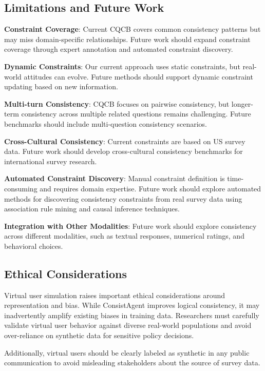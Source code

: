 \documentclass[sigconf, anonymous]{acmart}
\begin{document}
\subsection{Limitations and Future Work}

\textbf{Constraint Coverage}: Current CQCB covers common consistency patterns but may miss domain-specific relationships. Future work should expand constraint coverage through expert annotation and automated constraint discovery.

\textbf{Dynamic Constraints}: Our current approach uses static constraints, but real-world attitudes can evolve. Future methods should support dynamic constraint updating based on new information.

\textbf{Multi-turn Consistency}: CQCB focuses on pairwise consistency, but longer-term consistency across multiple related questions remains challenging. Future benchmarks should include multi-question consistency scenarios.

\textbf{Cross-Cultural Consistency}: Current constraints are based on US survey data. Future work should develop cross-cultural consistency benchmarks for international survey research.

\textbf{Automated Constraint Discovery}: Manual constraint definition is time-consuming and requires domain expertise. Future work should explore automated methods for discovering consistency constraints from real survey data using association rule mining and causal inference techniques.

\textbf{Integration with Other Modalities}: Future work should explore consistency across different modalities, such as textual responses, numerical ratings, and behavioral choices.

\subsection{Ethical Considerations}

Virtual user simulation raises important ethical considerations around representation and bias. While ConsistAgent improves logical consistency, it may inadvertently amplify existing biases in training data. Researchers must carefully validate virtual user behavior against diverse real-world populations and avoid over-reliance on synthetic data for sensitive policy decisions.

Additionally, virtual users should be clearly labeled as synthetic in any public communication to avoid misleading stakeholders about the source of survey data.
\end{document}
